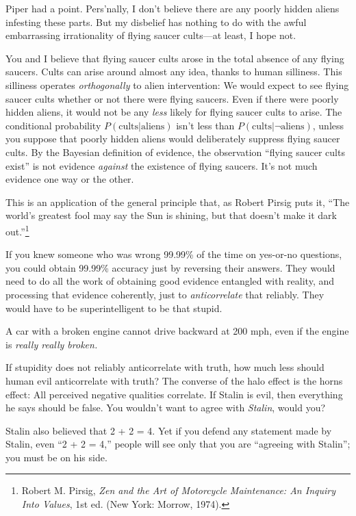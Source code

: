 {
 Piper had a point. Pers'nally, I
don't believe there are any poorly hidden aliens
infesting these parts. But my disbelief has nothing to do with the
awful embarrassing irrationality of flying saucer cults---at least, I
hope not.}

{
 You and I believe that flying saucer cults arose in the total
absence of any flying saucers. Cults can arise around almost any idea,
thanks to human silliness. This silliness operates
\textit{orthogonally} to alien intervention: We would expect to see
flying saucer cults whether or not there were flying saucers. Even if
there were poorly hidden aliens, it would not be any \textit{less}
likely for flying saucer cults to arise. The conditional probability
$P(\text{cults}|\text{aliens})$ isn't less than
$P(\text{cults}|\lnot \text{aliens})$, unless you suppose that poorly
hidden aliens would deliberately suppress flying saucer cults. By the
Bayesian definition of evidence, the observation
``flying saucer cults exist'' is not
evidence \textit{against} the existence of flying saucers.
It's not much evidence one way or the other.}

{
 This is an application of the general principle that, as Robert
Pirsig puts it, ``The world's greatest
fool may say the Sun is shining, but that doesn't make
it dark out.''\footnote{Robert M. Pirsig, \textit{Zen and the Art of Motorcycle
Maintenance: An Inquiry Into Values}, 1st ed. (New York: Morrow,
1974).}}

{
 If you knew someone who was wrong 99.99\% of the time on yes-or-no
questions, you could obtain 99.99\% accuracy just by reversing their
answers. They would need to do all the work of obtaining good evidence
entangled with reality, and processing that evidence coherently, just
to \textit{anticorrelate} that reliably. They would have to be
superintelligent to be that stupid.}

{
 A car with a broken engine cannot drive backward at 200 mph, even
if the engine is \textit{really really broken.}}

{
 If stupidity does not reliably anticorrelate with truth, how much
less should human evil anticorrelate with truth? The converse of the
halo effect is the horns effect: All perceived negative qualities
correlate. If Stalin is evil, then everything he says should be false.
You wouldn't want to agree with \textit{Stalin}, would
you?}

{
 Stalin also believed that 2 + 2 = 4. Yet if you defend any
statement made by Stalin, even ``2 + 2 =
4,'' people will see only that you are
``agreeing with Stalin''; you must
be on his side.}

